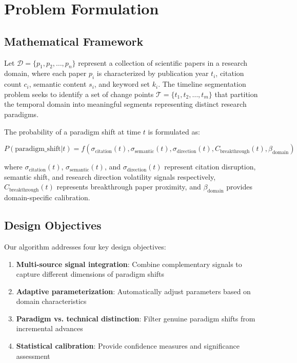 \documentclass[conference]{IEEEtran}
\begin{document}
\section{Problem Formulation}

\subsection{Mathematical Framework}

Let $\mathcal{D} = \{p_1, p_2, \ldots, p_n\}$ represent a collection of scientific papers in a research domain, where each paper $p_i$ is characterized by publication year $t_i$, citation count $c_i$, semantic content $s_i$, and keyword set $k_i$. The timeline segmentation problem seeks to identify a set of change points $\mathcal{T} = \{t_1, t_2, \ldots, t_m\}$ that partition the temporal domain into meaningful segments representing distinct research paradigms.

The probability of a paradigm shift at time $t$ is formulated as:

\begin{equation}
P(\text{paradigm\_shift} | t) = f(\sigma_{\text{citation}}(t), \sigma_{\text{semantic}}(t), \sigma_{\text{direction}}(t), C_{\text{breakthrough}}(t), \beta_{\text{domain}})
\end{equation}

where $\sigma_{\text{citation}}(t)$, $\sigma_{\text{semantic}}(t)$, and $\sigma_{\text{direction}}(t)$ represent citation disruption, semantic shift, and research direction volatility signals respectively, $C_{\text{breakthrough}}(t)$ represents breakthrough paper proximity, and $\beta_{\text{domain}}$ provides domain-specific calibration.

\subsection{Design Objectives}

Our algorithm addresses four key design objectives:

\begin{enumerate}
\item \textbf{Multi-source signal integration}: Combine complementary signals to capture different dimensions of paradigm shifts
\item \textbf{Adaptive parameterization}: Automatically adjust parameters based on domain characteristics
\item \textbf{Paradigm vs. technical distinction}: Filter genuine paradigm shifts from incremental advances
\item \textbf{Statistical calibration}: Provide confidence measures and significance assessment
\end{enumerate}
\end{document}

